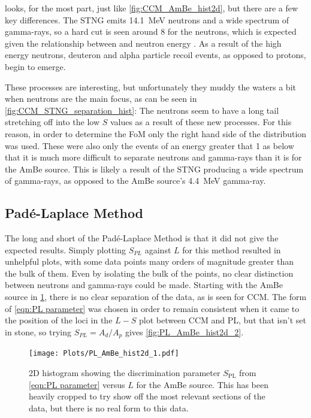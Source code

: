 \documentclass[11pt]{article}
\numberwithin{equation}{section}
\numberwithin{figure}{section}
\numberwithin{table}{section}
\begin{document}
\par {} looks, for the most part, just like \cref{fig:CCM_AmBe_hist2d}, but there are a few key differences. The STNG emits \SI{14.1}{\mega\electronvolt} neutrons and a wide spectrum of gamma-rays, so a hard cut is seen around \SI{8}{\mevee} for the neutrons, which is expected given the relationship between \unit{\mevee} and neutron energy \cite{Mevee}. As a result of the high energy neutrons, deuteron and alpha particle recoil events, as opposed to protons, begin to emerge. 
\par These processes are interesting, but unfortunately they muddy the waters a bit when neutrons are the main focus, as can be seen in \cref{fig:CCM_STNG_separation_hist}: The neutrons seem to have a long tail stretching off into the low $S$ values as a result of these new processes. For this reason, in order to determine the FoM only the right hand side of the distribution was used. These were also only the events of an energy greater that \SI{1}{\mevee} as below that it is much more difficult to separate neutrons and gamma-rays than it is for the AmBe source. This is likely a result of the STNG producing a wide spectrum of gamma-rays, as opposed to the AmBe source's \SI{4.4}{\mega\electronvolt} gamma-ray. 

\subsection{Pad\'e-Laplace Method}
\par The long and short of the Pad\'e-Laplace Method is that it did not give the expected results. Simply plotting $S_{PL}$ against $L$ for this method resulted in unhelpful plots, with some data points many orders of magnitude greater than the bulk of them. Even by isolating the bulk of the points, no clear distinction between neutrons and gamma-rays could be made. Starting with the AmBe source in \cref{fig:PL_AmBe_hist2d_1}, there is no clear separation of the data, as is seen for CCM. The form of \cref{eqn:PL parameter} was chosen in order to remain consistent when it came to the position of the loci in the $L-S$ plot between CCM and PL, but that isn't set in stone, so trying $S_{PL}=A_d/A_p$ gives \cref{fig:PL_AmBe_hist2d_2}.

\begin{figure}[H]
    \begin{center}
        \texttt{[image: Plots/PL\_AmBe\_hist2d\_1.pdf]}
        \caption{2D histogram showing the discrimination parameter $S_{\mathrm{PL}}$ from \cref{eqn:PL parameter} versus $L$ for the AmBe source. This has been heavily cropped to try show off the most relevant sections of the data, but there is no real form to this data.}
        \label{fig:PL_AmBe_hist2d_1}
    \end{center}
\end{figure}
\end{document}
